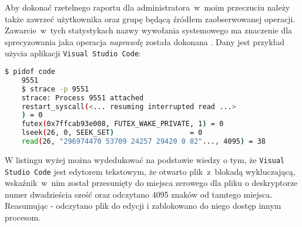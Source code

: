 Aby dokonać rzetelnego raportu dla administratora~w~moim przeczuciu należy także zawrzeć użytkownika oraz grupę będącą źródłem zaobserwowanej operacji. Zawarcie~w~tych statystykach nazwy wywołania systemowego ma znaczenie dla sprecyzowania jaka operacja \emph{naprawdę} została dokonana \cite{kernel}. Dany jest przykład użycia aplikacji \texttt{Visual Studio Code}: 
\begin{lstlisting}[language=bash,
    backgroundcolor=\color{EEGold!5!white},
    caption={Przykładowo używając \texttt{Visual Studio Code} niektóre operacje mogą
    sprawiać pozory, że na pliku wywołano polecenie \texttt{code} bez wiedzy co dokładnie zaszło podczas działania programu.},
    label={lst:helloC}]
    $ pidof code
    9551
    $ strace -p 9551
    strace: Process 9551 attached
    restart_syscall(<... resuming interrupted read ...>
    ) = 0
    futex(0x7ffcab93e008, FUTEX_WAKE_PRIVATE, 1) = 0
    lseek(26, 0, SEEK_SET)                  = 0
    read(26, "296974470 53709 24257 29420 0 82"..., 4095) = 38
\end{lstlisting}
W listingu wyżej można wydedukować na podstawie wiedzy o tym, że \texttt{Visual Studio Code} jest edytorem tekstowym, że otwarto plik~z~blokadą wykluczającą, wskaźnik~w~nim został przesunięty do miejsca zerowego dla pliku o deskryptorze numer dwadzieścia sześć oraz odczytano 4095 znaków od tamtego miejsca. Reasumując - odczytano plik do edycji i zablokowano do niego dostęp innym procesom.
